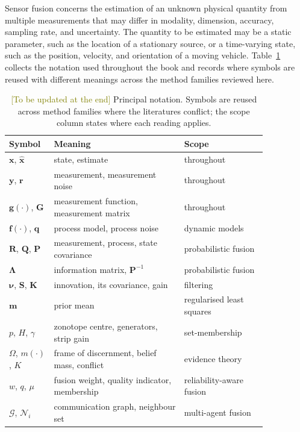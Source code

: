 \documentclass[11pt,oneside,openany]{book}
\begin{document}
Sensor fusion concerns the estimation of an unknown physical quantity from multiple measurements that may differ in modality, dimension, accuracy, sampling rate, and uncertainty. The quantity to be estimated may be a static parameter, such as the location of a stationary source, or a time-varying state, such as the position, velocity, and orientation of a moving vehicle. Table~\ref{tab:notation} collects the notation used throughout the book and records where symbols are reused with different meanings across the method families reviewed here.
\begin{table}[!t]
    \centering
    \small
    \caption{\textcolor{olive}{[To be updated at the end]} Principal notation. Symbols are reused across method families where the literatures conflict; the scope column states where each reading applies.}
    \label{tab:notation}
    \begin{tabular}{p{0.13\linewidth} p{0.44\linewidth} p{0.28\linewidth}}
        \hline
        \textbf{Symbol} & \textbf{Meaning} & \textbf{Scope} \\
        \hline
        $\mathbf{x}$, $\widehat{\mathbf{x}}$ & state, estimate & throughout \\
        $\mathbf{y}$, $\mathbf{r}$ & measurement, measurement noise & throughout \\
        $\mathbf{g}(\cdot)$, $\mathbf{G}$ & measurement function, measurement matrix & throughout \\
        $\mathbf{f}(\cdot)$, $\mathbf{q}$ & process model, process noise & dynamic models \\
        $\mathbf{R}$, $\mathbf{Q}$, $\mathbf{P}$ & measurement, process, state covariance & probabilistic fusion \\
        $\mathbf{\Lambda}$ & information matrix, $\mathbf{P}^{-1}$ & probabilistic fusion \\
        $\boldsymbol{\nu}$, $\mathbf{S}$, $\mathbf{K}$ & innovation, its covariance, gain & filtering \\
        $\mathbf{m}$ & prior mean & regularised least squares \\
        $p$, $H$, $\gamma$ & zonotope centre, generators, strip gain & set-membership \\
        $\Omega$, $m(\cdot)$, $K$ & frame of discernment, belief mass, conflict & evidence theory \\
        $w$, $q$, $\mu$ & fusion weight, quality indicator, membership & reliability-aware fusion \\
        $\mathcal{G}$, $\mathcal{N}_i$ & communication graph, neighbour set & multi-agent fusion \\
        \hline
    \end{tabular}
\end{table}
\end{document}

